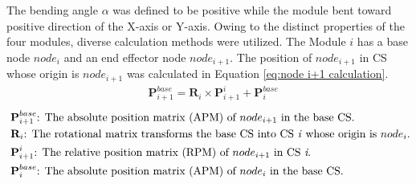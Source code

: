 \noindent The bending angle $\alpha$ was defined to be positive while the module bent toward positive 
direction of the X-axis or Y-axis. Owing to the distinct properties of the four modules, diverse calculation 
methods were utilized. The Module $i$ has a base node $node_i$ and an end effector node $node_{i+1}$. 
The position of $node_{i+1}$ in CS whose origin is $node_{i+1}$ was calculated in Equation 
\ref{eq:node i+1 calculation}.
\begin{align}
    &\textbf{P}_{i+1}^{base} = \textbf{R}_{i} \times \textbf{P}_{i+1}^{i} + \textbf{P}_{i}^{base}
    \label{eq:node i+1 calculation}
\end{align}
\vspace{-18mm}
\begin{align*}
    &\ \textbf{P}_{i+1}^{base}\text{: The absolute position matrix (APM) of $node_{i+1}$ in the base CS.}\\
    &\ \textbf{R}_{i}\text{: The rotational matrix transforms the base CS into CS \textit{i} whose origin is $node_i$.}\\
    &\ \textbf{P}_{i+1}^{i}\text{: The relative position matrix (RPM) of $node_{i+1}$ in CS \textit{i}.}\\
    &\ \textbf{P}_{i}^{base}\text{: The absolute position matrix (APM) of $node_{i}$ in the base CS.}
\end{align*}
